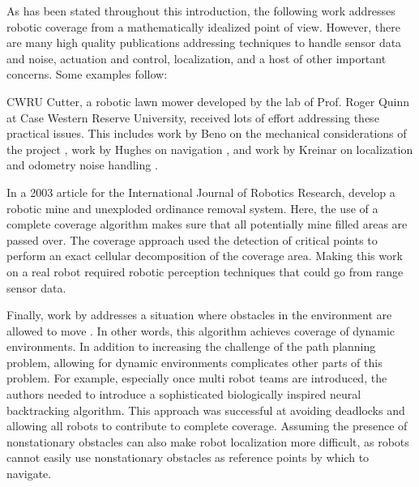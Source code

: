 As has been stated throughout this introduction, the following work addresses robotic coverage from a mathematically idealized point of view. However, there are many high quality publications addressing techniques to handle sensor data and noise, actuation and control, localization, and a host of other important concerns. Some examples follow:

CWRU Cutter, a robotic lawn mower developed by the lab of Prof. Roger Quinn at Case Western Reserve University, received lots of effort addressing these practical issues. This includes work by Beno on the mechanical considerations of the project \cite{Beno}, work by Hughes on navigation \cite{Hughes}, and work by Kreinar on localization and odometry noise handling \cite{Kreinar}.

In a 2003 article for the International Journal of Robotics Research, \citeauthor{Acar} develop a robotic mine and unexploded ordinance removal system. Here, the use of a complete coverage algorithm makes sure that all potentially mine filled areas are passed over. The coverage approach used the detection of critical points to perform an exact cellular decomposition of the coverage area. Making this work on a real robot required robotic perception techniques that could go from range sensor data.

Finally, work by \citeauthor{Liu} addresses a situation where obstacles in the environment are allowed to move \cite{Liu}. In other words, this algorithm achieves coverage of dynamic environments. In addition to increasing the challenge of the path planning problem, allowing for dynamic environments complicates other parts of this problem. For example, especially once multi robot teams are introduced, the authors needed to introduce a sophisticated biologically inspired neural backtracking algorithm. This approach was successful at avoiding deadlocks and allowing all robots to contribute to complete coverage. Assuming the presence of nonstationary obstacles can also make robot localization more difficult, as robots cannot easily use nonstationary obstacles as reference points by which to navigate.